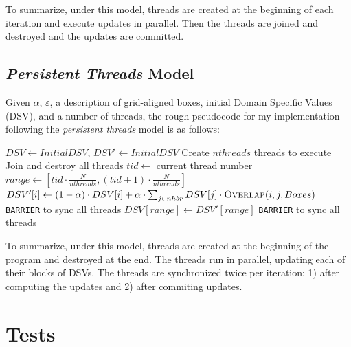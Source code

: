 \documentclass{article}
\begin{document}
To summarize, under this model, threads are created at the beginning of each
iteration and execute updates in parallel. Then the threads are joined and
destroyed and the updates are committed.

\vspace{-1em}
\subsection*{\emph{Persistent Threads} Model}

Given $\alpha$, $\varepsilon$, a description of grid-aligned boxes, initial
Domain Specific Values (DSV), and a number of threads, the rough pseudocode for
my implementation following the \emph{persistent threads} model is as follows:

\begin{algorithm}
\small
\begin{algorithmic}[1]
\State $DSV \gets Initial DSV$, $DSV' \gets Initial DSV$
\State Create $nthreads$ threads to execute 
\State Join and destroy all threads
\EndProcedure
{}
    \State $tid \gets$ current thread number
    \State $range \gets [ tid\cdot \frac{N}{nthreads}, (tid + 1)\cdot \frac{N}{nthreads} ]$
            \State $DSV'[i] \gets (1 - \alpha)\cdot DSV[i] + \alpha \cdot \sum_{j\in nhbr} DSV[j]\cdot \Call{Overlap}{i, j, Boxes}$
        \EndFor
        \State \texttt{BARRIER} to sync all threads
        \State $DSV[range] \gets DSV'[range]$
        \State \texttt{BARRIER} to sync all threads
    \EndWhile
\EndProcedure
\end{algorithmic}
\end{algorithm}

To summarize, under this model, threads are created at the beginning of the
program and destroyed at the end. The threads run in parallel, updating each of
their blocks of DSVs. The threads are synchronized twice per iteration: 1)
after computing the updates and 2) after commiting updates.

\section*{Tests}
\label{sec:tests}
\end{document}
